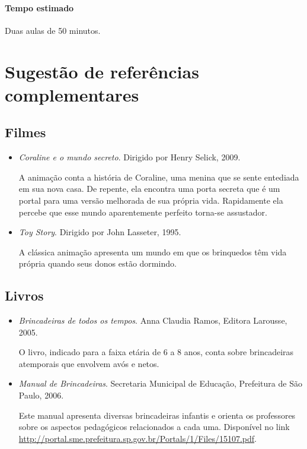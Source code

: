 \documentclass[11pt]{extarticle}
\begin{document}
\paragraph{Tempo estimado} Duas aulas de 50 minutos.

\section{Sugestão de referências complementares}

\subsection{Filmes}

\begin{itemize}

\item \textit{Coraline e o mundo secreto}. Dirigido por Henry Selick, 2009.

A animação conta a história de Coraline, uma menina que se sente entediada em sua nova casa. De repente, ela encontra uma porta secreta que é um portal para uma versão melhorada de sua própria vida. Rapidamente ela percebe que esse mundo aparentemente perfeito torna-se assustador.

\item \textit{Toy Story}. Dirigido por John Lasseter, 1995.

A clássica animação apresenta um mundo em que os brinquedos têm vida própria quando seus donos estão dormindo. 

\end{itemize}

\subsection{Livros}

\begin{itemize}

\item \textit{Brincadeiras de todos os tempos}. Anna Claudia Ramos, Editora Larousse, 2005.

O livro, indicado para a faixa etária de 6 a 8 anos, conta sobre brincadeiras atemporais que envolvem avós e netos.

\item \textit{Manual de Brincadeiras}. Secretaria Municipal de Educação, Prefeitura de São Paulo, 2006.

Este manual apresenta diversas brincadeiras infantis e orienta os professores sobre os aspectos pedagógicos relacionados a cada uma. Disponível no link \url{http://portal.sme.prefeitura.sp.gov.br/Portals/1/Files/15107.pdf}.

\end{itemize}
\end{document}
